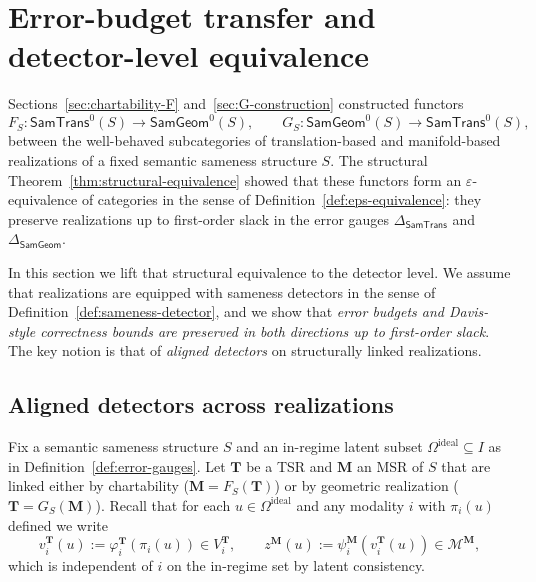 \documentclass[11pt]{article}
\newcommand{\SamTrans}{\mathsf{SamTrans}}
\newcommand{\SamGeom}{\mathsf{SamGeom}}
\begin{document}
\section{Error-budget transfer and detector-level equivalence}\label{sec:aligned-detectors}
\label{sec:error-transfer}

Sections~\ref{sec:chartability-F} and~\ref{sec:G-construction} constructed
functors
\[
F_S : \SamTrans^0(S) \to \SamGeom^0(S),
\qquad
G_S : \SamGeom^0(S) \to \SamTrans^0(S),
\]
between the well-behaved subcategories of translation-based and manifold-based
realizations of a fixed semantic sameness structure $S$.  The structural
Theorem~\ref{thm:structural-equivalence} showed that these functors form an
$\varepsilon$-equivalence of categories in the sense of
Definition~\ref{def:eps-equivalence}: they preserve realizations up to
first-order slack in the error gauges
$\Delta_{\SamTrans}$ and $\Delta_{\SamGeom}$.

In this section we lift that structural equivalence to the detector level.
We assume that realizations are equipped with sameness detectors in the sense
of Definition~\ref{def:sameness-detector}, and we show that
\emph{error budgets and Davis-style correctness bounds are preserved in
both directions up to first-order slack}.  The key notion is that of
\emph{aligned detectors} on structurally linked realizations.

\subsection{Aligned detectors across realizations}
\label{subsec:aligned-detectors}

Fix a semantic sameness structure $S$ and an in-regime latent subset
$\Omega^{\mathrm{ideal}} \subseteq I$ as in
Definition~\ref{def:error-gauges}.  Let $\mathbf{T}$ be a TSR and
$\mathbf{M}$ an MSR of $S$ that are linked either by chartability
($\mathbf{M} = F_S(\mathbf{T})$) or by geometric realization
($\mathbf{T} = G_S(\mathbf{M})$).  Recall that for each $u \in
\Omega^{\mathrm{ideal}}$ and any modality $i$ with $\pi_i(u)$ defined we
write
\[
v_i^{\mathbf{T}}(u)
  := \varphi_i^{\mathbf{T}}(\pi_i(u)) \in V_i^{\mathbf{T}},
\qquad
z^{\mathbf{M}}(u)
  := \psi_i^{\mathbf{M}}(v_i^{\mathbf{T}}(u)) \in \mathcal{M}^{\mathbf{M}},
\]
which is independent of $i$ on the in-regime set by latent consistency.
\end{document}
